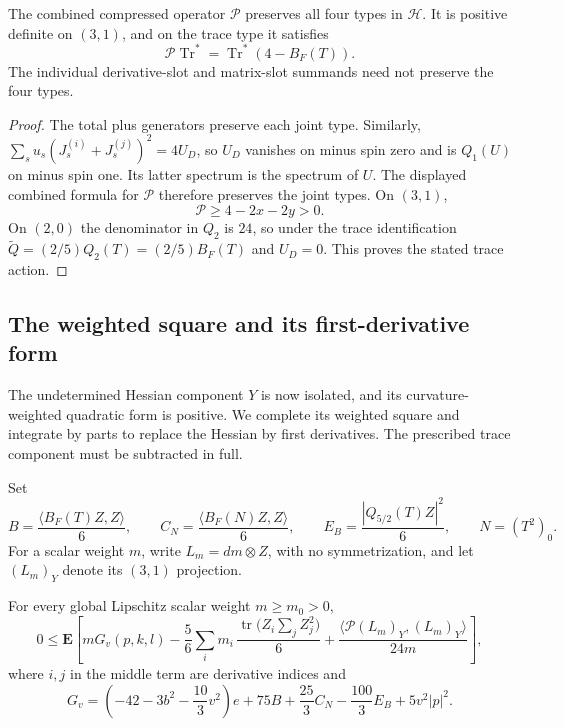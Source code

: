 \begin{lemma}
\label{lem:hessian-operator}
The combined compressed operator $\mathcal P$ preserves all four types
in $\mathcal H$. It is positive definite on $(3,1)$, and on the trace
type it satisfies
\[
 \mathcal P\operatorname{Tr}^*
   =\operatorname{Tr}^*(4-B_F(T)).
\]
The individual derivative-slot and matrix-slot summands need not preserve
the four types.
\end{lemma}

\begin{proof}
The total plus generators preserve each joint type. Similarly,
$\sum_su_s(J_s^{(i)}+J_s^{(j)})^2=4U_D$, so $U_D$ vanishes on minus
spin zero and is $Q_1(U)$ on minus spin one. Its latter spectrum is the
spectrum of $U$. The displayed combined formula for $\mathcal P$ therefore
preserves the joint types. On $(3,1)$,
\[
 \mathcal P\ge4-2x-2y>0.
\]
On $(2,0)$ the denominator in $Q_2$ is $24$, so under the trace
identification $\widetilde Q=(2/5)Q_2(T)=(2/5)B_F(T)$ and $U_D=0$.
This proves the stated trace action.
\end{proof}

\subsection{The weighted square and its first-derivative form}

The undetermined Hessian component $Y$ is now isolated, and its
curvature-weighted quadratic form is positive. We complete its weighted
square and integrate by parts to replace the Hessian by first derivatives.
The prescribed trace component must be subtracted in full.

Set
\[
 B=\frac{\langle B_F(T)Z,Z\rangle}{6},\qquad
 C_N=\frac{\langle B_F(N)Z,Z\rangle}{6},\qquad
 E_B=\frac{|Q_{5/2}(T)Z|^2}{6},
 \qquad N=(T^2)_0.
\]
For a scalar weight \(m\), write \(L_m=dm\otimes Z\), with no
symmetrization, and let \((L_m)_Y\) denote its \((3,1)\) projection.

\begin{proposition}
\label{prop:weighted-hessian}
For every global Lipschitz scalar weight \mbox{$m\ge m_0>0$},
\begin{equation}
 0\le\mathbf E\left[
 mG_v(p,k,l)
 -\frac56\sum_i m_i\,
    \frac{\operatorname{tr}\bigl(Z_i\sum_jZ_j^2\bigr)}6
 +\frac{\langle\mathcal P(L_m)_Y,(L_m)_Y\rangle}{24m}
 \right],
 \tag{10}\label{eq:10}
\end{equation}
where \(i,j\) in the middle term are derivative indices and
\[
 G_v=\left(-42-3b^2-\frac{10}{3}v^2\right)e
       +75B+\frac{25}{3}C_N-\frac{100}{3}E_B
       +5v^2|p|^2.
\]
\end{proposition}

